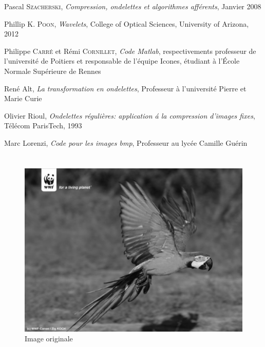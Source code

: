 \documentclass[a4paper,10pt]{report}
\theoremstyle{break}
\begin{document}
  \begin{thebibliography}{1}
      Pascal \textsc{Szacherski},
      \emph{Compression, ondelettes et algorithmes aff\'{e}rents},
      Janvier 2008
      
      Phillip \textsc{K. Poon},
      \emph{Wavelets},
      College of Optical Sciences, University of Arizona,
      2012
      
      Philippe \textsc{Carr\'{e}} et R\'{e}mi \textsc{Cornillet},
      \emph{Code Matlab},
      respectivements professeur de l'universit\'{e} de Poitiers et responsable de l'\'{e}quipe Icones,
      \'{e}tudiant \`{a} l'\'{E}cole Normale Sup\'{e}rieure de Rennes

      Ren\'{e} Alt,
      \emph{La transformation en ondelettes},
      Professeur \`{a} l'universit\'{e} Pierre et Marie Curie
    
      Olivier Rioul,
      \emph{Ondelettes r\'{e}guli\`{e}res: application \'{a} la compression d'images fixes},
      T\'{e}l\'{e}com ParisTech, 1993
      
      Marc Lorenzi,
      \emph{Code pour les images bmp},
      Professeur au lyc\'{e}e Camille Gu\'{e}rin
  \end{thebibliography}


\appendix

\chapter{}

  \begin{figure}[!h]
      \centering
      
      \includegraphics[width = 0.5 \linewidth]{ara_orig.eps}
      
      \caption{Image originale}
  \end{figure}
\end{document}

